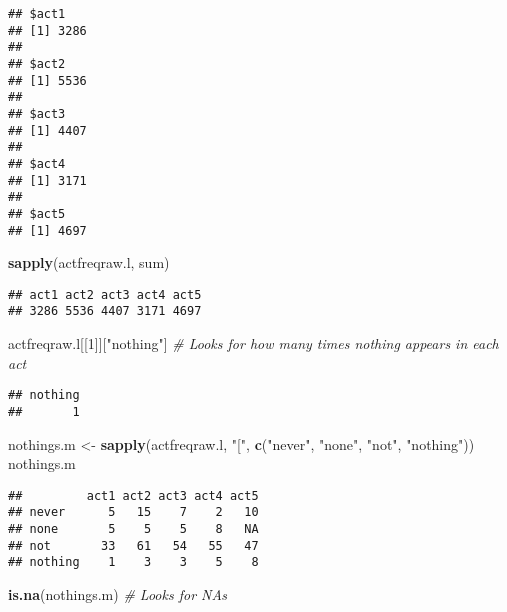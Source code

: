 \documentclass[
]{article}
\newenvironment{Shaded}{\begin{snugshade}}{\end{snugshade}}
\newcommand{\CommentTok}[1]{\textcolor[rgb]{0.56,0.35,0.01}{\textit{#1}}}
\newcommand{\DecValTok}[1]{\textcolor[rgb]{0.00,0.00,0.81}{#1}}
\newcommand{\KeywordTok}[1]{\textcolor[rgb]{0.13,0.29,0.53}{\textbf{#1}}}
\newcommand{\NormalTok}[1]{#1}
\newcommand{\StringTok}[1]{\textcolor[rgb]{0.31,0.60,0.02}{#1}}
\begin{document}
\begin{verbatim}
## $act1
## [1] 3286
## 
## $act2
## [1] 5536
## 
## $act3
## [1] 4407
## 
## $act4
## [1] 3171
## 
## $act5
## [1] 4697
\end{verbatim}

\begin{Shaded}
\begin{Highlighting}[]
\KeywordTok{sapply}\NormalTok{(actfreqraw.l, sum)}
\end{Highlighting}
\end{Shaded}

\begin{verbatim}
## act1 act2 act3 act4 act5 
## 3286 5536 4407 3171 4697
\end{verbatim}

\begin{Shaded}
\begin{Highlighting}[]
\NormalTok{actfreqraw.l[[}\DecValTok{1}\NormalTok{]][}\StringTok{"nothing"}\NormalTok{] }\CommentTok{# Looks for how many times nothing appears in each act}
\end{Highlighting}
\end{Shaded}

\begin{verbatim}
## nothing 
##       1
\end{verbatim}

\begin{Shaded}
\begin{Highlighting}[]
\NormalTok{nothings.m <-}\StringTok{ }\KeywordTok{sapply}\NormalTok{(actfreqraw.l, }\StringTok{"["}\NormalTok{, }\KeywordTok{c}\NormalTok{(}\StringTok{"never"}\NormalTok{, }\StringTok{"none"}\NormalTok{, }\StringTok{"not"}\NormalTok{, }\StringTok{"nothing"}\NormalTok{))}
\NormalTok{nothings.m}
\end{Highlighting}
\end{Shaded}

\begin{verbatim}
##         act1 act2 act3 act4 act5
## never      5   15    7    2   10
## none       5    5    5    8   NA
## not       33   61   54   55   47
## nothing    1    3    3    5    8
\end{verbatim}

\begin{Shaded}
\begin{Highlighting}[]
\KeywordTok{is.na}\NormalTok{(nothings.m) }\CommentTok{# Looks for NAs}
\end{Highlighting}
\end{Shaded}
\end{document}
